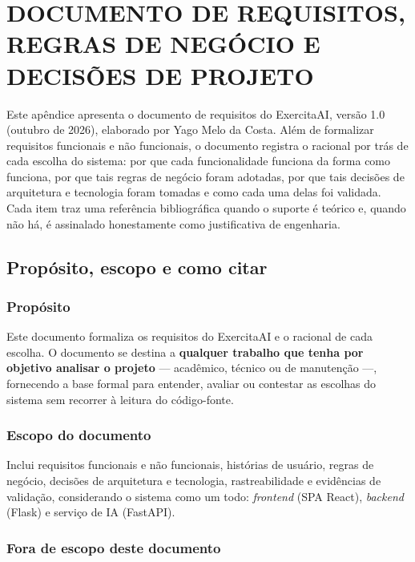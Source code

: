 \makeatletter
\newcommand{\seqcod}[1]{\@tfor\@codseq:=#1\do{\@codseq\allowbreak}}
\makeatother

\chapter{DOCUMENTO DE REQUISITOS, REGRAS DE NEGÓCIO E DECISÕES DE PROJETO}
\label{ap:requisitos}

Este apêndice apresenta o documento de requisitos do ExercitaAI, versão 1.0 (outubro de 2026), elaborado por Yago Melo da Costa. Além de formalizar requisitos funcionais e não funcionais, o documento registra o racional por trás de cada escolha do sistema: por que cada funcionalidade funciona da forma como funciona, por que tais regras de negócio foram adotadas, por que tais decisões de arquitetura e tecnologia foram tomadas e como cada uma delas foi validada. Cada item traz uma referência bibliográfica quando o suporte é teórico e, quando não há, é assinalado honestamente como justificativa de engenharia.

\section{Propósito, escopo e como citar}
\label{ap:req-proposito}

\subsection{Propósito}

Este documento formaliza os requisitos do ExercitaAI e o racional de cada escolha. O documento se destina a \textbf{qualquer trabalho que tenha por objetivo analisar o projeto} --- acadêmico, técnico ou de manutenção ---, fornecendo a base formal para entender, avaliar ou contestar as escolhas do sistema sem recorrer à leitura do código-fonte.

\subsection{Escopo do documento}
\label{ap:req-escopo}

Inclui requisitos funcionais e não funcionais, histórias de usuário, regras de negócio, decisões de arquitetura e tecnologia, rastreabilidade e evidências de validação, considerando o sistema como um todo: \emph{frontend} (SPA React), \emph{backend} (Flask) e serviço de IA (FastAPI).

\subsection{Fora de escopo deste documento}
\label{ap:req-fora-escopo}

